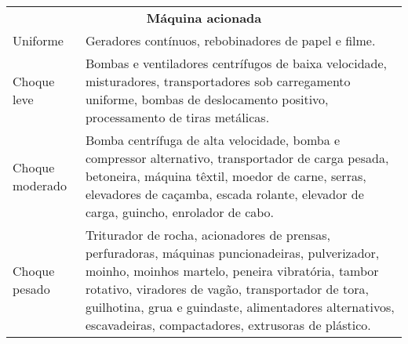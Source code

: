 \begin{table}[]
\begin{tabular}{ll}
\multicolumn{2}{c}{\textbf{Máquina acionada}}                                                                                                                                                                                                                                                                                               \\
Uniforme        & Geradores contínuos, rebobinadores de papel e filme.                                                                                                                                                                                                                                                                      \\
Choque leve     & Bombas e ventiladores centrífugos de baixa velocidade, misturadores, transportadores sob carregamento uniforme, bombas de deslocamento positivo, processamento de tiras metálicas.                                                                                                                                        \\
Choque moderado & Bomba centrífuga de alta velocidade, bomba e compressor alternativo, transportador de carga pesada, betoneira, máquina têxtil, moedor de carne, serras, elevadores de caçamba, escada rolante, elevador de carga, guincho, enrolador de cabo.                                                                             \\
Choque pesado   & Triturador de rocha, acionadores de prensas, perfuradoras, máquinas puncionadeiras, pulverizador, moinho, moinhos martelo, peneira vibratória, tambor rotativo, viradores de vagão, transportador de tora, guilhotina, grua e guindaste, alimentadores alternativos, escavadeiras, compactadores, extrusoras de plástico.
\end{tabular}
\end{table}